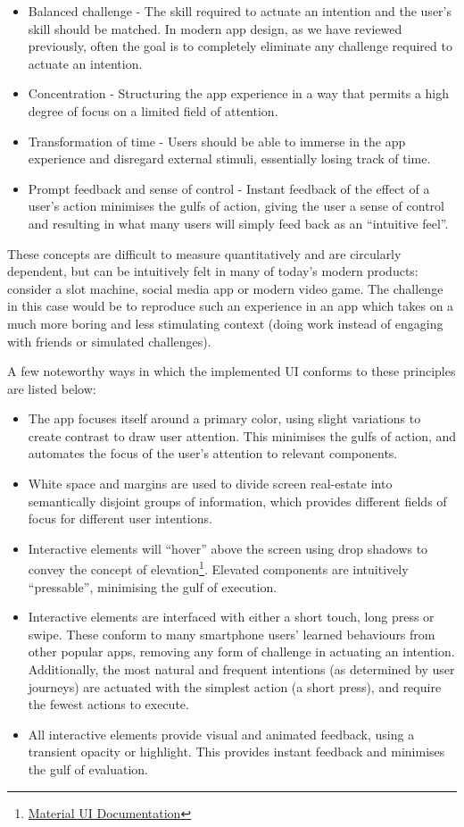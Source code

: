 \begin{itemize}
    \item Balanced challenge - The skill required to actuate an intention and the user's skill should be matched. In modern app design, as we have reviewed previously, often the goal is to completely eliminate any challenge required to actuate an intention.
    \item Concentration - Structuring the app experience in a way that permits a high degree of focus on a limited field of attention.
    \item Transformation of time - Users should be able to immerse in the app experience and disregard external stimuli, essentially losing track of time.
    \item Prompt feedback and sense of control - Instant feedback of the effect of a user's action minimises the gulfs of action, giving the user a sense of control and resulting in what many users will simply feed back as an ``intuitive feel''.
\end{itemize}

These concepts are difficult to measure quantitatively and are circularly dependent, but can be intuitively felt in many of today's modern products: consider a slot machine, social media app or modern video game. The challenge in this case would be to reproduce such an experience in an app which takes on a much more boring and less stimulating context (doing work instead of engaging with friends or simulated challenges).

A few noteworthy ways in which the implemented UI conforms to these principles are listed below:

\begin{itemize}
    \item The app focuses itself around a primary color, using slight variations to create contrast to draw user attention. This minimises the gulfs of action, and automates the focus of the user's attention to relevant components.
    \item White space and margins are used to divide screen real-estate into semantically disjoint groups of information, which provides different fields of focus for different user intentions.
    \item Interactive elements will ``hover'' above the screen using drop shadows to convey the concept of elevation\footnote{\href{https://material.io}{Material UI Documentation}}. Elevated components are intuitively ``pressable'', minimising the gulf of execution.
    \item Interactive elements are interfaced with either a short touch, long press or swipe. These conform to many smartphone users' learned behaviours from other popular apps, removing any form of challenge in actuating an intention. Additionally, the most natural and frequent intentions (as determined by user journeys) are actuated with the simplest action (a short press), and require the fewest actions to execute.
    \item All interactive elements provide visual and animated feedback, using a transient opacity or highlight. This provides instant feedback and minimises the gulf of evaluation.
\end{itemize}


